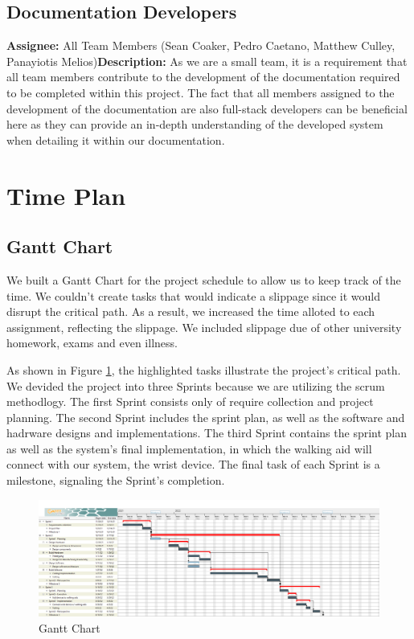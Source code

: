         \subsection{Documentation Developers} \textbf{Assignee: } All Team Members (Sean Coaker, Pedro Caetano, Matthew Culley, Panayiotis Melios)\newline \textbf{Description: } As we are a small team, it is a requirement that all team members contribute to the development of the documentation required to be completed within this project. The fact that all members assigned to the development of the documentation are also full-stack developers can be beneficial here as they can provide an in-depth understanding of the developed system when detailing it within our documentation.

    \section{Time Plan}

        \subsection{Gantt Chart} We built a Gantt Chart for the project schedule to allow us to keep track of the time.
        We couldn't create tasks that would indicate a slippage since it would disrupt the critical path. As a result,
        we increased the time alloted to each assignment, reflecting the slippage. We included slippage due of other
        university homework, exams and even illness.

            As shown in Figure \ref{fig:gantt_chart}, the highlighted tasks illustrate the project's critical path. We
            devided the project into three Sprints because we are utilizing the scrum methodlogy. The first Sprint
            consists only of require collection and project planning. The second Sprint includes the sprint plan, as
            well as the software and hadrware designs and implementations. The third Sprint contains the sprint plan as
            well as the system's final implementation, in which the walking aid will connect with our system, the wrist
            device. The final task of each Sprint is a milestone, signaling the Sprint's completion.

            \begin{figure}[H] \includegraphics[width=\linewidth]{graphics/Gantt_Chart.png} \caption{Gantt Chart}
            \label{fig:gantt_chart} \end{figure}

